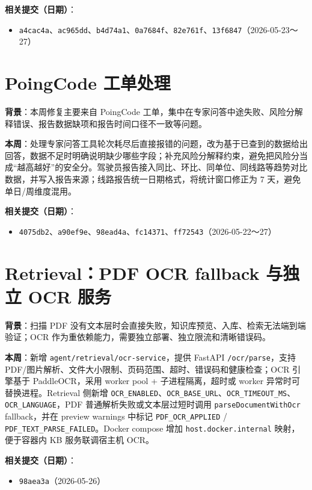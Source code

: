 \documentclass[UTF8]{ctexart}
\begin{document}
\textbf{相关提交（日期）}：
\begin{itemize}
\item \texttt{a4cac4a}、\texttt{ac965dd}、\texttt{b4d74a1}、\texttt{0a7684f}、\texttt{82e761f}、\texttt{13f6847}（2026-05-23～27）
\end{itemize}

\section{PoingCode 工单处理}

\textbf{背景}：本周修复主要来自 PoingCode 工单，集中在专家问答中途失败、风险分解释错误、报告数据缺项和报告时间口径不一致等问题。

\textbf{本周}：处理专家问答工具轮次耗尽后直接报错的问题，改为基于已查到的数据给出回答，数据不足时明确说明缺少哪些字段；补充风险分解释约束，避免把风险分当成“越高越好”的安全分。驾驶员报告接入同比、环比、同单位、同线路等趋势对比数据，并写入报告来源；线路报告统一日期格式，将统计窗口修正为 7 天，避免单日/周维度混用。

\textbf{相关提交（日期）}：
\begin{itemize}
\item \texttt{4075db2}、\texttt{a90ef9e}、\texttt{98ead4a}、\texttt{fc14371}、\texttt{ff72543}（2026-05-22～27）
\end{itemize}

\section{Retrieval：PDF OCR fallback 与独立 OCR 服务}

\textbf{背景}：扫描 PDF 没有文本层时会直接失败，知识库预览、入库、检索无法端到端验证；OCR 作为重依赖能力，需要独立部署、独立限流和清晰错误码。

\textbf{本周}：新增 \texttt{agent/retrieval/ocr-service}，提供 FastAPI \texttt{/ocr/parse}，支持 PDF/图片解析、文件大小限制、页码范围、超时、错误码和健康检查；OCR 引擎基于 PaddleOCR，采用 worker pool + 子进程隔离，超时或 worker 异常时可替换进程。Retrieval 侧新增 \texttt{OCR\_ENABLED}、\texttt{OCR\_BASE\_URL}、\texttt{OCR\_TIMEOUT\_MS}、\texttt{OCR\_LANGUAGE}，PDF 普通解析失败或文本层过短时调用 \texttt{parseDocumentWithOcr} fallback，并在 preview warnings 中标记 \texttt{PDF\_OCR\_APPLIED} / \texttt{PDF\_TEXT\_PARSE\_FAILED}。Docker compose 增加 \texttt{host.docker.internal} 映射，便于容器内 KB 服务联调宿主机 OCR。

\textbf{相关提交（日期）}：
\begin{itemize}
\item \texttt{98aea3a}（2026-05-26）
\end{itemize}
\end{document}
